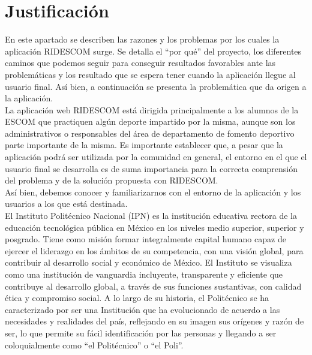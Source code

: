 	\section{Justificaci\'on}
	\noindent En este apartado se describen las razones y los  problemas por los cuales la aplicación RIDESCOM surge. Se detalla el “por qué” del proyecto, los diferentes caminos que podemos seguir para conseguir resultados favorables ante las problemáticas y los resultado que se espera tener cuando la aplicación llegue al usuario final. Así bien, a continuación se presenta la problemática que da origen a la aplicación.\\
	La aplicación web RIDESCOM está dirigida principalmente a los alumnos de la ESCOM que practiquen algún deporte impartido por la misma, aunque son los administrativos o responsables del área de departamento de fomento deportivo parte importante de la misma. Es importante establecer que, a pesar que la aplicación podrá ser utilizada por la comunidad en general,  el entorno en el que el usuario final se desarrolla es de suma importancia para la correcta comprensión del problema y de la solución propuesta con RIDESCOM.\\ 
	Así bien, debemos conocer y familiarizarnos con el entorno de la aplicación y los usuarios a los que está destinada. \\
	El Instituto Politécnico Nacional (IPN) es la institución educativa rectora de la educación tecnológica pública en México en los niveles medio superior, superior y posgrado. Tiene como misión formar integralmente capital humano capaz de ejercer el liderazgo en los ámbitos de su competencia, con una visión global, para contribuir al desarrollo social y económico de México. El Instituto se visualiza como una institución de vanguardia incluyente, transparente y eficiente que contribuye al desarrollo global, a través de sus funciones sustantivas, con calidad ética y compromiso social. A lo largo de su historia, el Politécnico se ha caracterizado por ser una Institución que ha evolucionado de acuerdo a las necesidades y realidades del país, reflejando en su imagen sus orígenes y razón de ser, lo que permite su fácil identificación por las personas y llegando a ser coloquialmente como “el Politécnico” o “el Poli”. \cite{hist} \\
